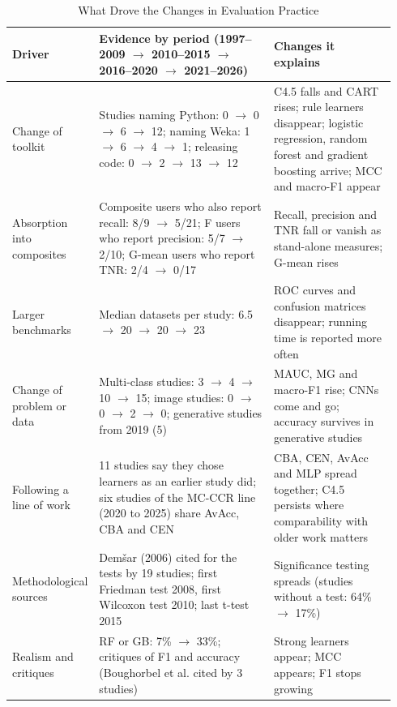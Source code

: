 \begin{table}[t]
  \caption{What Drove the Changes in Evaluation Practice}
  \label{tab:empirical-drivers}
  \footnotesize
  \setlength{\tabcolsep}{4pt}
  \begin{tabular}{@{}p{0.16\linewidth}p{0.46\linewidth}p{0.32\linewidth}@{}}
    \toprule
    Driver & Evidence by period (1997--2009 $\to$ 2010--2015 $\to$ 2016--2020 $\to$ 2021--2026) & Changes it explains\\
    \midrule
    Change of toolkit & Studies naming Python: 0 $\to$ 0 $\to$ 6 $\to$ 12; naming Weka: 1 $\to$ 6 $\to$ 4 $\to$ 1; releasing code: 0 $\to$ 2 $\to$ 13 $\to$ 12 & C4.5 falls and CART rises; rule learners disappear; logistic regression, random forest and gradient boosting arrive; MCC and macro-F1 appear\\
    Absorption into composites & Composite users who also report recall: 8/9 $\to$ 5/21; F users who report precision: 5/7 $\to$ 2/10; G-mean users who report TNR: 2/4 $\to$ 0/17 & Recall, precision and TNR fall or vanish as stand-alone measures; G-mean rises\\
    Larger benchmarks & Median datasets per study: 6.5 $\to$ 20 $\to$ 20 $\to$ 23 & ROC curves and confusion matrices disappear; running time is reported more often\\
    Change of problem or data & Multi-class studies: 3 $\to$ 4 $\to$ 10 $\to$ 15; image studies: 0 $\to$ 0 $\to$ 2 $\to$ 0; generative studies from 2019 (5) & MAUC, MG and macro-F1 rise; CNNs come and go; accuracy survives in generative studies\\
    Following a line of work & 11 studies say they chose learners as an earlier study did; six studies of the MC-CCR line (2020 to 2025) share AvAcc, CBA and CEN & CBA, CEN, AvAcc and MLP spread together; C4.5 persists where comparability with older work matters\\
    Methodological sources & Demšar (2006) cited for the tests by 19 studies; first Friedman test 2008, first Wilcoxon test 2010; last t-test 2015 & Significance testing spreads (studies without a test: 64\% $\to$ 17\%)\\
    Realism and critiques & RF or GB: 7\% $\to$ 33\%; critiques of F1 and accuracy (Boughorbel et al. cited by 3 studies) & Strong learners appear; MCC appears; F1 stops growing\\
    \bottomrule
  \end{tabular}
\end{table}
